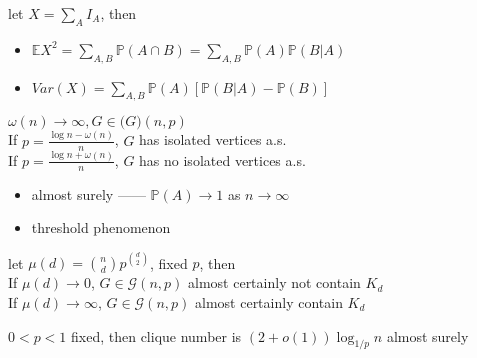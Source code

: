 \begin{fact}
    let $X = \sum_A I_A$, then
    \begin{itemize}
        \item $\mathbb{E}X^2 = \sum_{A, B} \mathbb{P}(A \cap B) = \sum_{A, B} \mathbb{P}(A)\mathbb{P}(B|A)$
        \item $Var(X) = \sum_{A, B} \mathbb{P}(A) [\mathbb{P}(B | A) - \mathbb{P}(B)]$
    \end{itemize}
\end{fact}

\begin{thm}
    $\omega(n) \rightarrow \infty, G \in \mathcal(G)(n, p)$ \\
    If $p = \frac{\log n - \omega(n)}{n}$, $G$ has isolated vertices a.s. \\
    If $p = \frac{\log n + \omega(n)}{n}$, $G$ has no isolated vertices a.s.
\end{thm}

\begin{itemize}
    \item almost surely ------ $\mathbb{P}(A) \rightarrow 1$ as $n \rightarrow \infty$
    \item threshold phenomenon
\end{itemize}

\begin{thm}
    let $\mu(d) = {n \choose d}p^{d \choose 2}$, fixed $p$, then \\
    If $\mu(d) \rightarrow 0$, $G \in \mathcal{G}(n, p)$ almost certainly not contain $K_d$ \\
    If $\mu(d) \rightarrow \infty$, $G \in \mathcal{G}(n, p)$ almost certainly contain $K_d$
\end{thm}

\begin{cor}
    $0 < p < 1$ fixed, then clique number is $(2 + o(1))\log_{1/p}n$ almost surely
\end{cor}


